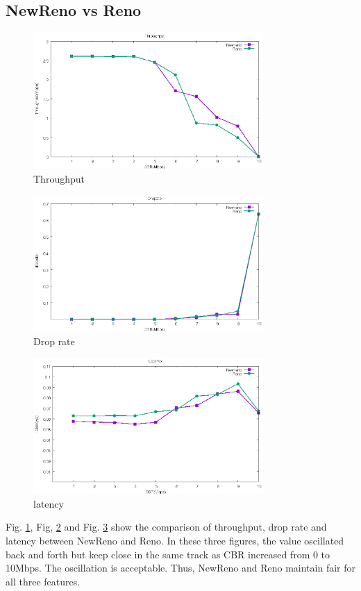 \documentclass[10pt, conference]{IEEEtran}
\begin{document}
	\subsection{NewReno vs Reno}
	\begin{figure}[H]
		\centering
		\includegraphics[width=3.45in]{imgs/exp2_tp_Newreno_Reno.eps}
		\caption[Optional caption]{Throughput}
		\label{fig:11}
	\end{figure}
	\begin{figure}[H]
		\centering
		\includegraphics[width=3.45in]{imgs/exp2_dr_Newreno_Reno.eps}
		\caption[Optional caption]{Drop rate}
		\label{fig:12}
	\end{figure}
	\begin{figure}[H]
		\centering
		\includegraphics[width=3.45in]{imgs/exp2_la_Newreno_Reno.eps}
		\caption[Optional caption]{latency}
		\label{fig:13}
	\end{figure}
	Fig. \ref{fig:11}, Fig, \ref{fig:12} and Fig. \ref{fig:13} show the comparison of throughput, drop rate and latency between NewReno and Reno. In these three figures, the value oscillated back and forth but keep close in the same track as CBR increased from 0 to 10Mbps. The oscillation is acceptable. Thus,  NewReno and Reno maintain fair for all three features.
	
\end{document}
